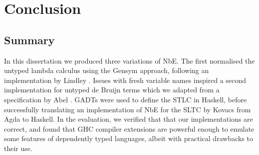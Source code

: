 \chapter{Conclusion}
\label{chap:conclusion}


% 


\section{Summary}
In this dissertation we produced three variations of NbE. The first normalised the untyped lambda calculus using the Gensym approach, following an implementation by Lindley \cite{slides}. Issues with fresh variable names inspired a second implementation for untyped de Bruijn terms which we adapted from a specification by Abel \cite{deBruijn}. GADTs were used to define the STLC in Haskell, before successfully translating an implementation of NbE for the SLTC by Kovacs \cite{AgdaNbe} from Agda to Haskell. In the evaluation, we verified that that our implementations are correct, and found that GHC compiler extensions are powerful enough to emulate some features of dependently typed languages, albeit with practical drawbacks to their use.

